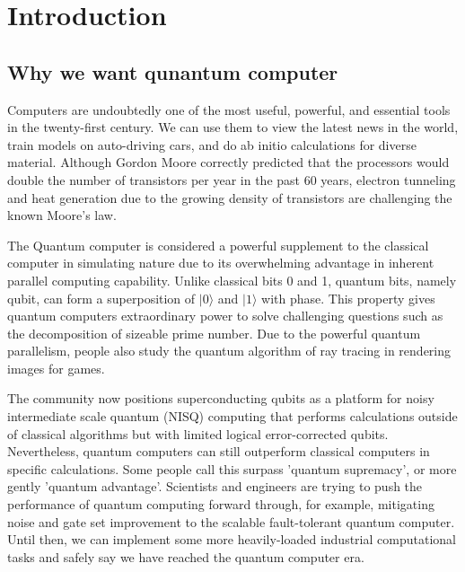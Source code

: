 \section{Introduction}
\subsection{Why we want qunantum computer}
Computers are undoubtedly one of the most useful, powerful, and essential tools in the twenty-first century. We can use them to view the latest news in the world, train models on auto-driving cars, and do ab initio calculations for diverse material. Although Gordon Moore correctly predicted that the processors would double the number of transistors per year in the past 60 years, electron tunneling and heat generation due to the growing density of transistors are challenging the known Moore's law.

The Quantum computer is considered a powerful supplement to the classical computer in simulating nature due to its overwhelming advantage in inherent parallel computing capability. Unlike classical bits 0 and 1, quantum bits, namely qubit, can form a superposition of $|0\rangle$ and $|1\rangle$ with phase. This property gives quantum computers extraordinary power to solve challenging questions such as the decomposition of sizeable prime number\cite{RN74}. Due to the powerful quantum parallelism, people also study the quantum algorithm of ray tracing in rendering images for games\cite{RN76}.

The community now positions superconducting qubits as a platform for noisy intermediate scale quantum (NISQ) computing that performs calculations outside of classical algorithms but with limited logical error-corrected qubits\cite{RN1}. Nevertheless, quantum computers can still outperform classical computers in specific calculations. Some people call this surpass 'quantum supremacy'\cite{RN44}, or more gently 'quantum advantage'\cite{RN77}. Scientists and engineers are trying to push the performance of quantum computing forward through, for example, mitigating noise and gate set improvement to the scalable fault-tolerant quantum computer. Until then, we can implement some more heavily-loaded industrial computational tasks and safely say we have reached the quantum computer era.

